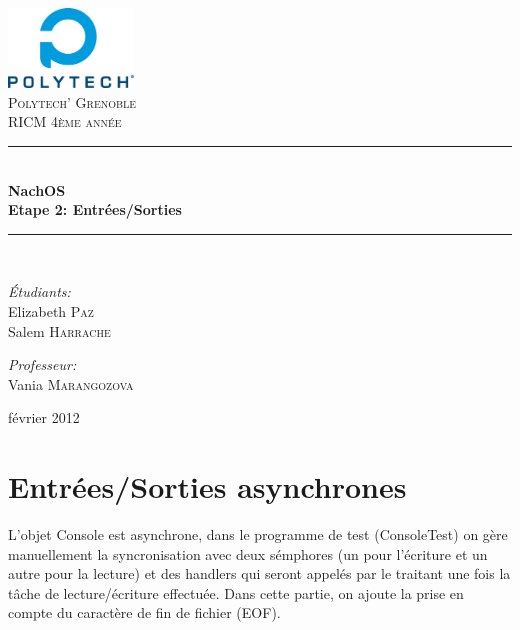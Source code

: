 \documentclass[a4paper,10pt]{article}
\newcommand{\HRule}{\rule{\linewidth}{0.5mm}}
\begin{document}
\begin{titlepage}

\begin{center}


\includegraphics[width=0.25\textwidth]{../images/logo}\\[1cm]

\textsc{\LARGE Polytech' Grenoble}\\[1.5cm]

\textsc{\Large RICM 4\`eme ann\'ee}\\[1.2cm]


\HRule \\[0.4cm]
{ \huge \bfseries NachOS\\[0.6cm]
Etape 2: Entrées/Sorties}
\\[0.4cm]

\HRule \\[2cm]

\begin{minipage}{0.4\textwidth}
\begin{flushleft} \large
\emph{\'Etudiants:}\\
Elizabeth \textsc{Paz} \\
Salem \textsc{Harrache}
\end{flushleft}
\end{minipage}
\begin{minipage}{0.4\textwidth}
\begin{flushright} \large
\emph{Professeur:} \\
Vania \textsc{Marangozova}
\end{flushright}
\end{minipage}

\vfill

{\large  février 2012}

\end{center}

\end{titlepage}

\section{Entrées/Sorties asynchrones}

L'objet Console est asynchrone, dans le programme de test (ConsoleTest) on
gère manuellement la syncronisation avec deux sémphores (un pour l'écriture et
un autre pour la lecture) et des handlers qui seront appelés par le traitant
une fois la tâche de lecture/écriture effectuée. Dans cette partie, on ajoute la
prise en compte du caractère de fin de fichier (EOF).
\end{document}

